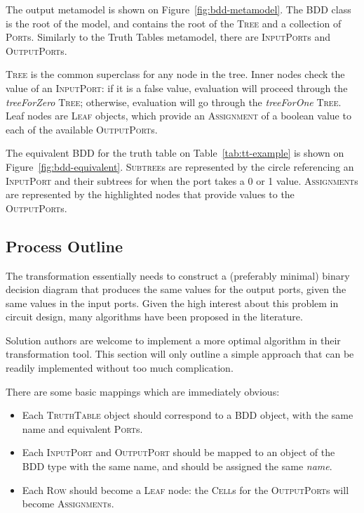 \documentclass[a4paper]{scrartcl}
\newcommand*{\class}[1]{\textsc{#1}}
\newcommand*{\feature}[1]{\emph{#1}}
\begin{document}
The output metamodel is shown on Figure~\ref{fig:bdd-metamodel}. The \class{BDD}
class is the root of the model, and contains the root of the \class{Tree}
and a collection of \class{Port}s. Similarly to the Truth Tables metamodel,
there are \class{Input\-Port}s and \class{Output\-Port}s.

\class{Tree} is the common superclass for any node in the tree. Inner nodes
check the value of an \class{Input\-Port}: if it is a false value, evaluation
will proceed through the \feature{tree\-For\-Zero} \class{Tree}; otherwise,
evaluation will go through the \feature{tree\-For\-One} \class{Tree}. Leaf nodes
are \class{Leaf} objects, which provide an \class{Assignment} of a boolean value
to each of the available \class{Output\-Port}s.

The equivalent BDD for the truth table on Table~\ref{tab:tt-example} is shown on
Figure~\ref{fig:bdd-equivalent}. \class{Subtree}s are represented by the circle
referencing an \class{Input\-Port} and their subtrees for when the port takes a
0 or 1 value. \class{Assignment}s are represented by the highlighted nodes that
provide values to the \class{Output\-Port}s.

\subsection{Process Outline}
\label{sec:process-outline}

The transformation essentially needs to construct a (preferably minimal) binary
decision diagram that produces the same values for the output ports, given the
same values in the input ports. Given the high interest about this problem in
circuit design, many algorithms have been proposed in the literature.

Solution authors are welcome to implement a more optimal algorithm in their
transformation tool. This section will only outline a simple approach that can
be readily implemented without too much complication.

There are some basic mappings which are immediately obvious:

\begin{itemize}
\item Each \class{TruthTable} object should correspond to a \class{BDD} object,
  with the same name and equivalent \class{Port}s.

\item Each \class{Input\-Port} and \class{Output\-Port} should be mapped to an
  object of the BDD type with the same name, and should be assigned the same
  \feature{name}.

\item Each \class{Row} should become a \class{Leaf} node: the \class{Cell}s for
  the \class{Output\-Port}s will become \class{Assignment}s.
\end{itemize}
\end{document}
